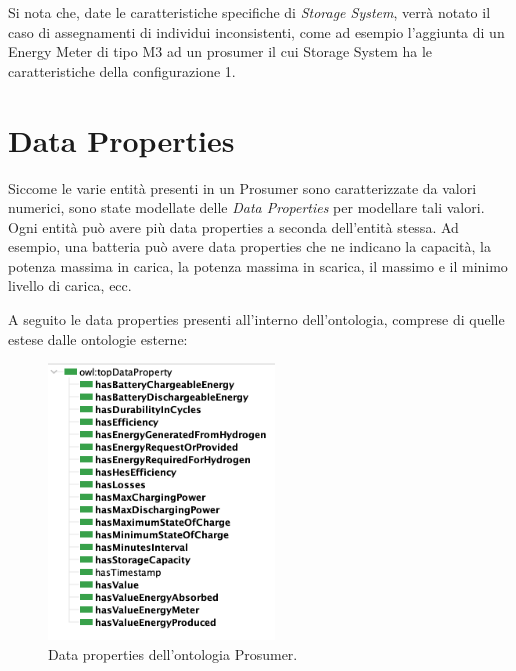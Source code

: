 Si nota che, date le caratteristiche specifiche di \textit{Storage System}, verrà notato il caso di assegnamenti di individui inconsistenti, come ad esempio l'aggiunta di un Energy Meter di tipo M3 ad un prosumer il cui Storage System ha le caratteristiche della configurazione 1.

\section{Data Properties}

Siccome le varie entità presenti in un Prosumer sono caratterizzate da valori numerici, sono state modellate delle \textit{Data Properties} per modellare tali valori.
Ogni entità può avere più data properties a seconda dell'entità stessa.
Ad esempio, una batteria può avere data properties che ne indicano la capacità, la potenza massima in carica, la potenza massima in scarica, il massimo e il minimo livello di carica, ecc.

A seguito le data properties presenti all'interno dell'ontologia, comprese di quelle estese dalle ontologie esterne:

\begin{figure}[!ht]
    \centering
    \includegraphics[width=6cm]{images/datap_prosumer.png}
    \caption{Data properties dell'ontologia Prosumer.}
    \label{fig:datap_prosumer}
\end{figure}

